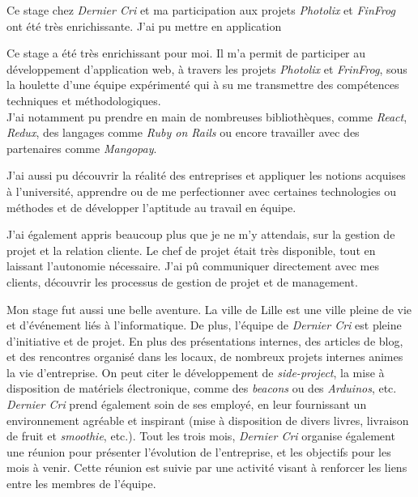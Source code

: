 Ce stage chez \emph{Dernier Cri} et ma participation aux projets
\emph{Photolix} et \emph{FinFrog} ont été très enrichissante. J'ai pu
mettre en application

\bigskip

Ce stage a été très enrichissant pour moi. Il m'a permit de participer
au développement d'application web, à travers les projets
\emph{Photolix} et \emph{FrinFrog}, sous la houlette d'une équipe
expérimenté qui à su me transmettre des compétences techniques et
méthodologiques.\\
J'ai notamment pu prendre en main de nombreuses bibliothèques, comme
\emph{React}, \emph{Redux}, des langages comme \emph{Ruby on Rails} ou
encore travailler avec des partenaires comme \emph{Mangopay}.

\bigskip

J'ai aussi pu découvrir la réalité des entreprises et appliquer les
notions acquises à l'université, apprendre ou de me perfectionner avec
certaines technologies ou méthodes et de développer l'aptitude au
travail en équipe.

\bigskip

J'ai également appris beaucoup plus que je ne m'y attendais, sur la
gestion de projet et la relation cliente. Le chef de projet était très
disponible, tout en laissant l'autonomie nécessaire. J'ai pû communiquer
directement avec mes clients, découvrir les processus de gestion de
projet et de management.

\bigskip

Mon stage fut aussi une belle aventure. La ville de Lille est une ville
pleine de vie et d'événement liés à l'informatique. De plus, l'équipe de
\emph{Dernier Cri} est pleine d'initiative et de projet. En plus des
présentations internes, des articles de blog, et des rencontres organisé
dans les locaux, de nombreux projets internes animes la vie
d'entreprise. On peut citer le développement de \emph{side-project}, la
mise à disposition de matériels électronique, comme des \emph{beacons}
ou des \emph{Arduinos}, etc.\\
\emph{Dernier Cri} prend également soin de ses employé, en leur
fournissant un environnement agréable et inspirant (mise à disposition
de divers livres, livraison de fruit et \emph{smoothie}, etc.). Tout les
trois mois, \emph{Dernier Cri} organise également une réunion pour
présenter l'évolution de l'entreprise, et les objectifs pour les mois à
venir. Cette réunion est suivie par une activité visant à renforcer les
liens entre les membres de l'équipe.

